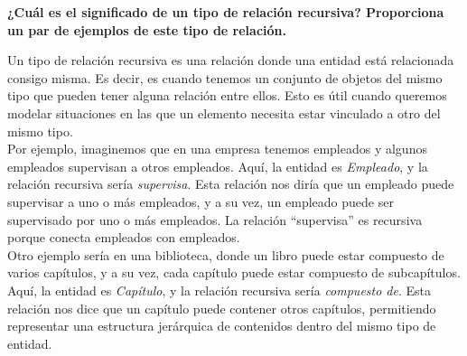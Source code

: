 \begin{center}
    \textbf{¿Cuál es el significado de un tipo de relación recursiva? Proporciona un par de ejemplos de este tipo de relación.}
\end{center}

\vspace{.3cm}

Un tipo de relación recursiva es una relación donde una entidad está relacionada consigo misma. Es decir, es cuando tenemos un conjunto de objetos del mismo tipo que pueden tener alguna relación entre ellos. Esto es útil cuando queremos modelar situaciones en las que un elemento necesita estar vinculado a otro del mismo tipo. \cite{lucidchart-2023} \\

Por ejemplo, imaginemos que en una empresa tenemos empleados y algunos empleados supervisan a otros empleados. Aquí, la entidad es \textit{Empleado}, y la relación recursiva sería \textit{supervisa}. Esta relación nos diría que un empleado puede supervisar a uno o más empleados, y a su vez, un empleado puede ser supervisado por uno o más empleados. La relación “supervisa” es recursiva porque conecta empleados con empleados. \\

Otro ejemplo sería en una biblioteca, donde un libro puede estar compuesto de varios capítulos, y a su vez, cada capítulo puede estar compuesto de subcapítulos. Aquí, la entidad es \textit{Capítulo}, y la relación recursiva sería \textit{compuesto de}. Esta relación nos dice que un capítulo puede contener otros capítulos, permitiendo representar una estructura jerárquica de contenidos dentro del mismo tipo de entidad. \\